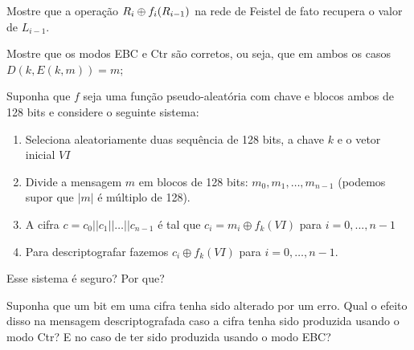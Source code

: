 \begin{exercicio}
Mostre que a operação $R_i \oplus f_i(R_{i-1})$ na rede de Feistel de fato recupera o valor de $L_{i-1}$.
\end{exercicio}

\begin{exercicio}
  Mostre que os modos EBC e Ctr são corretos, ou seja, que em ambos os casos $D(k, E(k,m)) = m$;
\end{exercicio}

\begin{exercicio}
  Suponha que $f$ seja uma função pseudo-aleatória com chave e blocos ambos de 128 bits e considere o seguinte sistema:
  \begin{enumerate}
  \item Seleciona aleatoriamente duas sequência de 128 bits, a chave $k$ e o vetor inicial $VI$
  \item Divide a mensagem $m$ em blocos de 128 bits: $m_0, m_1, \dots, m_{n-1}$ (podemos supor que $|m|$ é múltiplo de 128).
  \item A cifra $c = c_0 || c_1 || \dots || c_{n-1}$ é tal que $c_i = m_i \oplus f_k(VI)$ para $i = 0, ..., n-1$
  \item Para descriptografar fazemos $c_i \oplus f_k(VI)$ para $i = 0, \dots, n-1$.
  \end{enumerate}
  Esse sistema é seguro? Por que?
\end{exercicio}

\begin{exercicio}
Suponha que um bit em uma cifra tenha sido alterado por um erro.
Qual o efeito disso na mensagem descriptografada caso a cifra tenha sido produzida usando o modo Ctr? E no caso de ter sido produzida usando o modo EBC?  
\end{exercicio}



